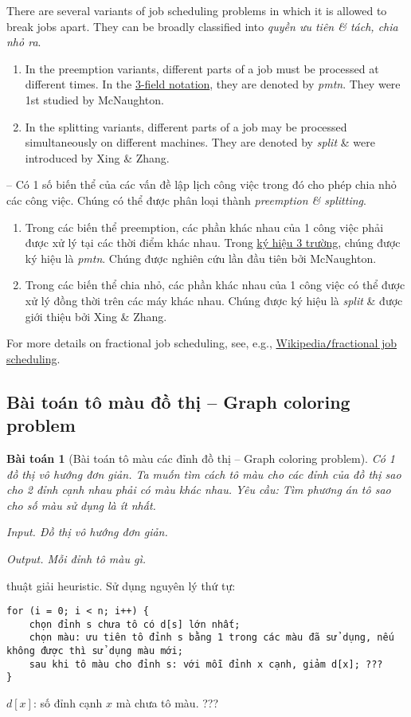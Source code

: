 \documentclass{article}
\newtheorem{baitoan}{Bài toán}
\begin{document}
There are several variants of job scheduling problems in which it is allowed to break jobs apart. They can be broadly classified into {\it quyền ưu tiên \& tách, chia nhỏ ra}.
\begin{enumerate}
	\item In the preemption variants, different parts of a job must be processed at different times. In the \href{https://en.wikipedia.org/wiki/Optimal_job_scheduling}{3-field notation}, they are denoted by {\it pmtn}. They were 1st studied by {\sc McNaughton}.
	\item In the splitting variants, different parts of a job may be processed simultaneously on different machines. They are denoted by {\it split} \& were introduced by {\sc Xing \& Zhang}.
\end{enumerate}
-- Có 1 số biến thể của các vấn đề lập lịch công việc trong đó cho phép chia nhỏ các công việc. Chúng có thể được phân loại thành {\it preemption \& splitting}.
\begin{enumerate}
	\item Trong các biến thể preemption, các phần khác nhau của 1 công việc phải được xử lý tại các thời điểm khác nhau. Trong \href{https://en.wikipedia.org/wiki/Optimal_job_scheduling}{ký hiệu 3 trường}, chúng được ký hiệu là {\it pmtn}. Chúng được nghiên cứu lần đầu tiên bởi {\sc McNaughton}.
	\item Trong các biến thể chia nhỏ, các phần khác nhau của 1 công việc có thể được xử lý đồng thời trên các máy khác nhau. Chúng được ký hiệu là {\it split} \& được giới thiệu bởi {\sc Xing \& Zhang}.
\end{enumerate}
For more details on fractional job scheduling, see, e.g., \href{https://en.wikipedia.org/wiki/Fractional_job_scheduling}{Wikipedia{\tt/}fractional job scheduling}.


\subsection{Bài toán tô màu đồ thị -- Graph coloring problem}

\begin{baitoan}[Bài toán tô màu các đỉnh đồ thị -- Graph coloring problem]
	Có 1 đồ thị vô hướng đơn giản. Ta muốn tìm cách tô màu cho các đỉnh của đồ thị sao cho 2 đỉnh cạnh nhau phải có màu khác nhau. Yêu cầu: Tìm phương án tô sao cho số màu sử dụng là ít nhất.
	\item {\sf Input.} Đồ thị vô hướng đơn giản.
	\item {\sf Output.} Mỗi đỉnh tô màu gì.
\end{baitoan}
{ thuật giải heuristic.} Sử dụng nguyên lý thứ tự:
\begin{verbatim}
for (i = 0; i < n; i++) {
    chọn đỉnh s chưa tô có d[s] lớn nhất;
    chọn màu: ưu tiên tô đỉnh s bằng 1 trong các màu đã sử dụng, nếu không được thì sử dụng màu mới;
    sau khi tô màu cho đỉnh s: với mỗi đỉnh x cạnh, giảm d[x]; ???
}
\end{verbatim}
$d[x]$: số đỉnh cạnh $x$ mà chưa tô màu. ???
\end{document}
